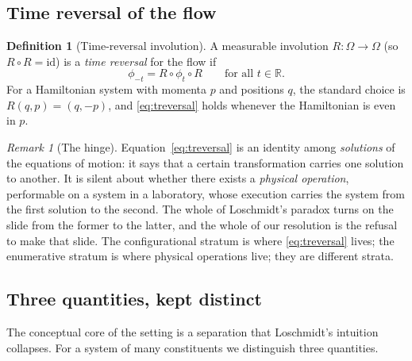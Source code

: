 \documentclass[11pt,a4paper]{article}
\theoremstyle{thmstyle}
\theoremstyle{definition}
\newtheorem{definition}[theorem]{Definition}
\theoremstyle{remark}
\newtheorem{remark}[theorem]{Remark}
\newcommand{\R}{\mathbb{R}}
\newcommand{\Tinv}{R}
\newcommand{\flow}{\phi}
\begin{document}
\subsection{Time reversal of the flow}
\label{sec:treversal}

\begin{definition}[Time-reversal involution]
\label{def:treversal}
A measurable involution $\Tinv\colon\Omega\to\Omega$ (so
$\Tinv\circ\Tinv=\mathrm{id}$) is a \emph{time reversal} for the flow if
\begin{equation}
\flow_{-t}=\Tinv\circ\flow_t\circ\Tinv
\qquad\text{for all }t\in\R.
\label{eq:treversal}
\end{equation}
For a Hamiltonian system with momenta $p$ and positions $q$, the standard
choice is $\Tinv(q,p)=(q,-p)$, and \eqref{eq:treversal} holds whenever the
Hamiltonian is even in $p$.
\end{definition}

\begin{remark}[The hinge]
\label{rem:hinge}
Equation~\eqref{eq:treversal} is an identity among \emph{solutions} of
the equations of motion: it says that a certain transformation carries one
solution to another. It is silent about whether there exists a
\emph{physical operation}, performable on a system in a laboratory, whose
execution carries the system from the first solution to the second. The
whole of Loschmidt's paradox turns on the slide from the former to the
latter, and the whole of our resolution is the refusal to make that
slide. The configurational stratum is where \eqref{eq:treversal} lives;
the enumerative stratum is where physical operations live; they are
different strata.
\end{remark}

\subsection{Three quantities, kept distinct}
\label{sec:three}

The conceptual core of the setting is a separation that Loschmidt's
intuition collapses. For a system of many constituents we distinguish
three quantities.
\end{document}

